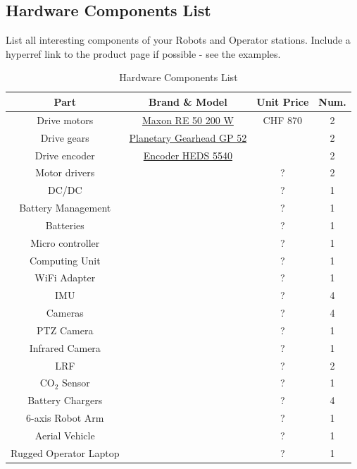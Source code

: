 \documentclass[journal]{IEEEtran}
\begin{document}
\subsection{Hardware Components List}
List all interesting components of your Robots and Operator stations.
Include a hyperref link to the product page if possible - see the examples.

\begin{table}
\renewcommand{\arraystretch}{1}
 \tabcolsep=0.1cm
\caption{Hardware Components List}
\label{tab:HardwareList}
\centering
\begin{tabular}{|c|c|c|c|}
\hline
Part & Brand \& Model & Unit Price & Num.\\
\hline
Drive motors &  \href{http://www.maxonmotor.com/maxon/view/content/products}{Maxon RE 50 200 W}& CHF 870 & 2 \\
Drive gears &  \href{http://www.maxonmotor.com/maxon/view/content/products}{Planetary Gearhead GP 52}&  & 2 \\
Drive encoder &  \href{http://www.maxonmotor.com/maxon/view/content/products}{ Encoder HEDS 5540}&  & 2 \\ 
Motor drivers &  \href{http://example.com}{ }& ? & 2 \\\hline
DC/DC &  \href{http://example.com}{ }& ? & 1 \\
Battery Management &  \href{http://example.com}{ }& ? & 1 \\
Batteries &  \href{http://example.com}{ }& ? & 1 \\\hline
Micro controller &  \href{http://example.com}{ }& ? & 1 \\
Computing Unit &  \href{http://example.com}{ }& ? & 1 \\\hline
WiFi Adapter &  \href{http://example.com}{ }& ? & 1 \\\hline
IMU &  \href{http://example.com}{ }& ? & 4 \\
Cameras &  \href{http://example.com}{ }& ? & 4 \\
PTZ Camera &  \href{http://example.com}{ }& ? & 1 \\
Infrared Camera &  \href{http://example.com}{ }& ? & 1 \\
LRF &  \href{http://example.com}{ }& ? & 2 \\
CO$_2$ Sensor &  \href{http://example.com}{ }& ? & 1 \\\hline
Battery Chargers &  \href{http://example.com}{ }& ? & 4 \\ \hline
6-axis Robot Arm &  \href{http://example.com}{ }& ? & 1 \\ \hline
Aerial Vehicle &  \href{http://example.com}{ }& ? & 1 \\ \hline
Rugged Operator Laptop &  \href{http://example.com}{ }& ? & 1 \\ 

\hline 
\end{tabular}
\end{table}
\end{document}
